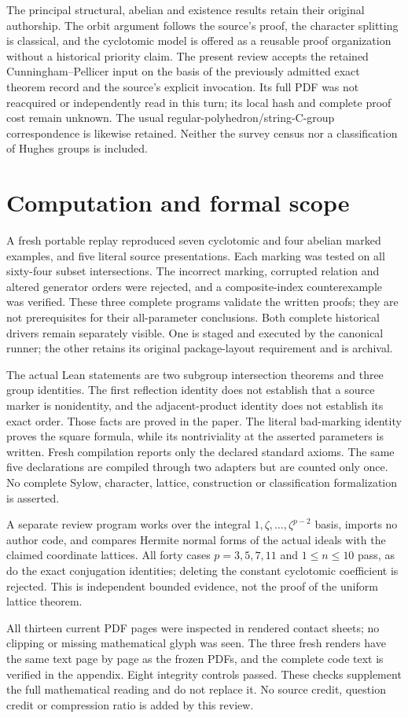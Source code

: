 \documentclass[11pt,a4paper]{article}
\begin{document}
The principal structural, abelian and existence results retain their original authorship. The orbit argument follows the source's proof, the character splitting is classical, and the cyclotomic model is offered as a reusable proof organization without a historical priority claim. The present review accepts the retained Cunningham--Pellicer input on the basis of the previously admitted exact theorem record and the source's explicit invocation. Its full PDF was not reacquired or independently read in this turn; its local hash and complete proof cost remain unknown. The usual regular-polyhedron/string-C-group correspondence is likewise retained. Neither the survey census nor a classification of Hughes groups is included.

\section*{Computation and formal scope}
A fresh portable replay reproduced seven cyclotomic and four abelian marked examples, and five literal source presentations. Each marking was tested on all sixty-four subset intersections. The incorrect marking, corrupted relation and altered generator orders were rejected, and a composite-index counterexample was verified. These three complete programs validate the written proofs; they are not prerequisites for their all-parameter conclusions. Both complete historical drivers remain separately visible. One is staged and executed by the canonical runner; the other retains its original package-layout requirement and is archival.

The actual Lean statements are two subgroup intersection theorems and three group identities. The first reflection identity does not establish that a source marker is nonidentity, and the adjacent-product identity does not establish its exact order. Those facts are proved in the paper. The literal bad-marking identity proves the square formula, while its nontriviality at the asserted parameters is written. Fresh compilation reports only the declared standard axioms. The same five declarations are compiled through two adapters but are counted only once. No complete Sylow, character, lattice, construction or classification formalization is asserted.

A separate review program works over the integral $1,\zeta,\ldots,\zeta^{p-2}$ basis, imports no author code, and compares Hermite normal forms of the actual ideals with the claimed coordinate lattices. All forty cases $p=3,5,7,11$ and $1\leq n\leq10$ pass, as do the exact conjugation identities; deleting the constant cyclotomic coefficient is rejected. This is independent bounded evidence, not the proof of the uniform lattice theorem.

All thirteen current PDF pages were inspected in rendered contact sheets; no clipping or missing mathematical glyph was seen. The three fresh renders have the same text page by page as the frozen PDFs, and the complete code text is verified in the appendix. Eight integrity controls passed. These checks supplement the full mathematical reading and do not replace it. No source credit, question credit or compression ratio is added by this review.
\end{document}
